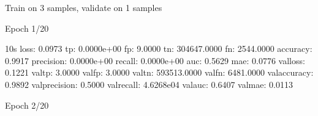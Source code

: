 \documentclass[letterpaper,10pt,english]{sphinxmanual}
\begin{document}
\begin{sphinxVerbatim}[commandchars=\\\{\}]
  
   
   
                           
                            
\end{sphinxVerbatim}

\begin{sphinxVerbatim}[commandchars=\\\{\}]
Train on 3 samples, validate on 1 samples
\end{sphinxVerbatim}

\begin{sphinxVerbatim}[commandchars=\\\{\}]
Epoch 1/20
\end{sphinxVerbatim}

\begin{sphinxVerbatim}[commandchars=\\\{\}]
 \PYGZhy{} 10s \PYGZhy{} loss: 0.0973 \PYGZhy{} tp: 0.0000e+00 \PYGZhy{} fp: 9.0000 \PYGZhy{} tn: 304647.0000 \PYGZhy{} fn: 2544.0000 \PYGZhy{} accuracy: 0.9917 \PYGZhy{} precision: 0.0000e+00 \PYGZhy{} recall: 0.0000e+00 \PYGZhy{} auc: 0.5629 \PYGZhy{} mae: 0.0776 \PYGZhy{} val\PYGZus{}loss: 0.1221 \PYGZhy{} val\PYGZus{}tp: 3.0000 \PYGZhy{} val\PYGZus{}fp: 3.0000 \PYGZhy{} val\PYGZus{}tn: 593513.0000 \PYGZhy{} val\PYGZus{}fn: 6481.0000 \PYGZhy{} val\PYGZus{}accuracy: 0.9892 \PYGZhy{} val\PYGZus{}precision: 0.5000 \PYGZhy{} val\PYGZus{}recall: 4.6268e\PYGZhy{}04 \PYGZhy{} val\PYGZus{}auc: 0.6407 \PYGZhy{} val\PYGZus{}mae: 0.0113
\end{sphinxVerbatim}

\begin{sphinxVerbatim}[commandchars=\\\{\}]
Epoch 2/20
\end{sphinxVerbatim}
\end{document}
